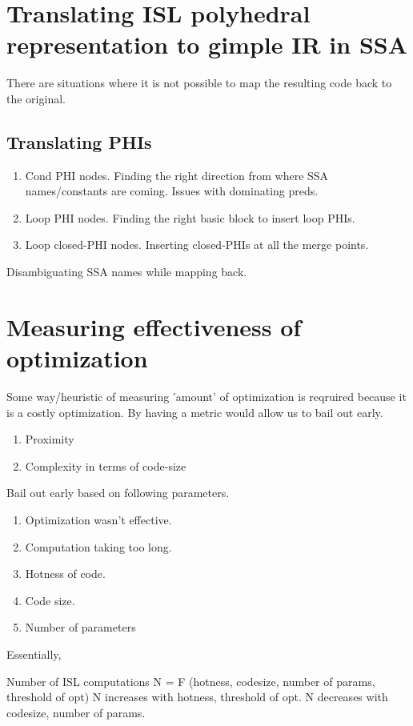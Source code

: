 \section{Translating ISL polyhedral representation to gimple IR in SSA}
There are situations where it is not possible to map the resulting code back to the original.
\subsection {Translating PHIs}
\begin{enumerate}
  \item Cond PHI nodes. Finding the right direction from where SSA names/constants are coming. Issues with dominating
    preds.
  \item Loop PHI nodes. Finding the right basic block to insert loop PHIs.
  \item Loop closed-PHI nodes. Inserting closed-PHIs at all the merge points.
\end{enumerate}
Disambiguating SSA names while mapping back.



\section{Measuring effectiveness of optimization}
Some way/heuristic of measuring 'amount' of optimization is reqruired because it is a costly optimization.
By having a metric would allow us to bail out early.
\begin{enumerate}
  \item Proximity
  \item Complexity in terms of code-size
\end{enumerate}

Bail out early based on following parameters.
\begin{enumerate}
  \item Optimization wasn't effective.
  \item Computation taking too long.
  \item Hotness of code.
  \item Code size.
  \item Number of parameters
\end{enumerate}

Essentially,

Number of ISL computations N = F (hotness, codesize, number of params, threshold of opt)
N increases with hotness, threshold of opt.
N decreases with codesize, number of params.


